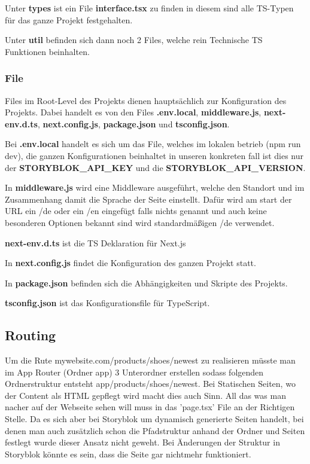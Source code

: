 Unter \textbf{types} ist ein File \textbf{interface.tsx} zu finden in diesem sind alle TS-Typen für das ganze Projekt festgehalten.

Unter \textbf{util} befinden sich dann noch 2 Files, welche rein Technische TS Funktionen beinhalten.

\subsubsection*{File}
Files im Root-Level des Projekts dienen hauptsächlich zur Konfiguration des Projekts. Dabei handelt es von den Files \textbf{.env.local}, \textbf{middleware.js}, \textbf{next-env.d.ts}, \textbf{next.config.js}, \textbf{package.json} und \textbf{tsconfig.json}.

Bei \textbf{.env.local} handelt es sich um das File, welches im lokalen betrieb (npm run dev), die ganzen Konfigurationen beinhaltet in unseren konkreten fall ist dies nur der \textbf{STORYBLOK\_API\_KEY} und die \textbf{STORYBLOK\_API\_VERSION}.

In \textbf{middleware.js} wird eine Middleware ausgeführt, welche den Standort und im Zusammenhang damit die Sprache der Seite einstellt. Dafür wird am start der URL ein /de oder ein /en eingefügt falls nichts genannt und auch keine besonderen Optionen bekannt sind wird standardmäßigen /de verwendet.

\textbf{next-env.d.ts} ist die TS Deklaration für Next.js

In \textbf{next.config.js} findet die Konfiguration des ganzen Projekt statt.

In \textbf{package.json} befinden sich die Abhängigkeiten und Skripte des Projekts.

\textbf{tsconfig.json} ist das Konfigurationsfile für TypeScript.

\subsection{Routing}
Um die Rute mywebsite.com/products/shoes/newest zu realisieren müsste man im App Router (Ordner app) 3 Unterordner erstellen sodass folgenden Ordnerstruktur entsteht app/products/shoes/newest. Bei Statischen Seiten, wo der Content als HTML gepflegt wird macht dies auch Sinn. All das was man nacher auf der Webseite sehen will muss in das 'page.tsx' File an der Richtigen Stelle. 
Da es sich aber bei Storyblok um dynamisch generierte Seiten handelt, bei denen man auch zusätzlich schon die Pfadstruktur anhand der Ordner und Seiten festlegt wurde dieser Ansatz nicht geweht. Bei Änderungen der Struktur in Storyblok könnte es sein, dass die Seite gar nichtmehr funktioniert. 

